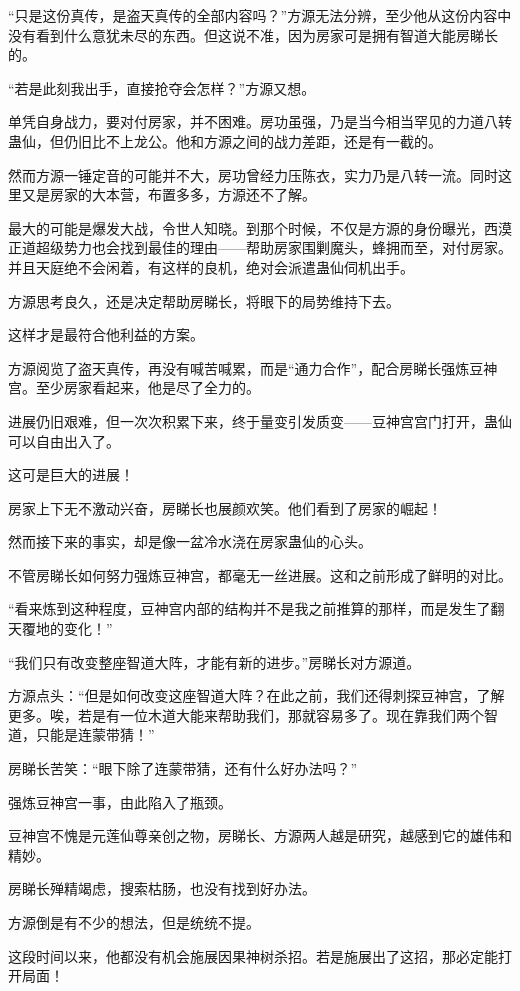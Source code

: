 \begin{this_body}
“只是这份真传，是盗天真传的全部内容吗？”方源无法分辨，至少他从这份内容中没有看到什么意犹未尽的东西。但这说不准，因为房家可是拥有智道大能房睇长的。

“若是此刻我出手，直接抢夺会怎样？”方源又想。

单凭自身战力，要对付房家，并不困难。房功虽强，乃是当今相当罕见的力道八转蛊仙，但仍旧比不上龙公。他和方源之间的战力差距，还是有一截的。

然而方源一锤定音的可能并不大，房功曾经力压陈衣，实力乃是八转一流。同时这里又是房家的大本营，布置多多，方源还不了解。

最大的可能是爆发大战，令世人知晓。到那个时候，不仅是方源的身份曝光，西漠正道超级势力也会找到最佳的理由——帮助房家围剿魔头，蜂拥而至，对付房家。并且天庭绝不会闲着，有这样的良机，绝对会派遣蛊仙伺机出手。

方源思考良久，还是决定帮助房睇长，将眼下的局势维持下去。

这样才是最符合他利益的方案。

方源阅览了盗天真传，再没有喊苦喊累，而是“通力合作”，配合房睇长强炼豆神宫。至少房家看起来，他是尽了全力的。

进展仍旧艰难，但一次次积累下来，终于量变引发质变——豆神宫宫门打开，蛊仙可以自由出入了。

这可是巨大的进展！

房家上下无不激动兴奋，房睇长也展颜欢笑。他们看到了房家的崛起！

然而接下来的事实，却是像一盆冷水浇在房家蛊仙的心头。

不管房睇长如何努力强炼豆神宫，都毫无一丝进展。这和之前形成了鲜明的对比。

“看来炼到这种程度，豆神宫内部的结构并不是我之前推算的那样，而是发生了翻天覆地的变化！”

“我们只有改变整座智道大阵，才能有新的进步。”房睇长对方源道。

方源点头：“但是如何改变这座智道大阵？在此之前，我们还得刺探豆神宫，了解更多。唉，若是有一位木道大能来帮助我们，那就容易多了。现在靠我们两个智道，只能是连蒙带猜！”

房睇长苦笑：“眼下除了连蒙带猜，还有什么好办法吗？”

强炼豆神宫一事，由此陷入了瓶颈。

豆神宫不愧是元莲仙尊亲创之物，房睇长、方源两人越是研究，越感到它的雄伟和精妙。

房睇长殚精竭虑，搜索枯肠，也没有找到好办法。

方源倒是有不少的想法，但是统统不提。

这段时间以来，他都没有机会施展因果神树杀招。若是施展出了这招，那必定能打开局面！


\end{this_body}
